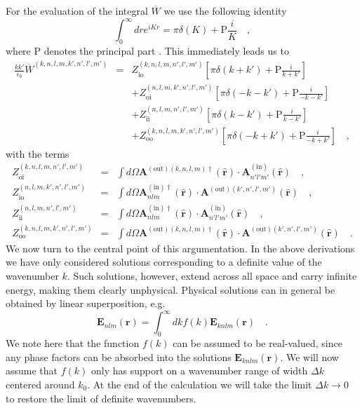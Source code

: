 \documentclass[10pt,letterpaper]{article}
\renewcommand{\vec}[1]{\mathbf{#1}}
\let\oldhat\hat
\renewcommand{\hat}[1]{\oldhat{\vec{#1}}}
\begin{document}
For the evaluation of the integral $\overline{W}$ we use the following identity
\begin{equation}
\int_{0}^{\infty}dre^{iKr}=\pi\delta(K)+\text{P}\frac{i}{K} \quad ,
\end{equation}
where $\text{P}$ denotes the principal part \cite{Bronshtein2013}. This immediately leads us to
\begin{eqnarray}
\frac{kk'}{\epsilon_b}\overline{W}^{(k,n,l,m,k',n',l',m')} &=& Z_{\text{io}}^{(k,n,l,m,n',l',m')}[\pi\delta(k+k')+\text{P}\frac{i}{k+k'}] \nonumber \\
& & +Z_{\text{oi}}^{(n,l,m,k',n',l',m')}[\pi\delta(-k-k')+\text{P}\frac{i}{-k-k'}] \nonumber \\
& & +Z_{\text{ii}}^{(n,l,m,n',l',m')}[\pi\delta(k-k')+\text{P}\frac{i}{k-k'}] \nonumber \\
& & +Z_{\text{oo}}^{(k,n,l,m,k',n',l',m')}[\pi\delta(-k+k')+\text{P}\frac{i}{-k+k'}] \quad ,\label{eq:norm_integral_infinite_part}
\end{eqnarray}
with the terms
\begin{eqnarray}
Z_{\text{oi}}^{(k,n,l,m,n',l',m')} &=& \int d\Omega \vec{A}^{(\text{out})(k,n,l,m)\dagger}(\hat{r}) \cdot \vec{A}_{n'l'm'}^{(\text{in})}(\hat{r})  \quad , \nonumber \\ 
Z_{\text{io}}^{(n,l,m,k',n',l',m')} &=& \int d\Omega \vec{A}_{nlm}^{(\text{in})\dagger}(\hat{r}) \cdot \vec{A}^{(\text{out})(k',n',l',m')}(\hat{r})  \quad , \nonumber \\ 
Z_{\text{ii}}^{(n,l,m,n',l',m')} &=& \int d\Omega \vec{A}_{nlm}^{(\text{in})\dagger}(\hat{r}) \cdot \vec{A}_{n'l'm'}^{(\text{in})}(\hat{r})  \quad , \nonumber \\ 
Z_{\text{oo}}^{(k,n,l,m,k',n',l',m')} &=& \int d\Omega \vec{A}^{(\text{out})(k,n,l,m)\dagger}(\hat{r}) \cdot \vec{A}^{(\text{out})(k',n',l',m')}(\hat{r}) \quad .
\end{eqnarray}
We now turn to the central point of this argumentation. In the above derivations we have only considered solutions corresponding to a definite value of the wavenumber $k$. Such solutions, however, extend across all space and carry infinite energy, making them clearly unphysical. Physical solutions can in general be obtained by linear superposition, e.g.
\begin{equation} \label{eq:physical_field}
\vec{E}_{nlm}(\vec{r}) = \int_0^\infty dk f(k) \vec{E}_{knlm}(\vec{r}) \quad .
\end{equation}
We note here that the function $f(k)$ can be assumed to be real-valued, since any phase factors can be absorbed into the solutions $\vec{E}_{knlm}(\vec{r})$. We will now assume that $f(k)$ only has support on a wavenumber range of width $\Delta k$ centered around $k_0$. At the end of the calculation we will take the limit $\Delta k \rightarrow 0$ to restore the limit of definite wavenumbers.
\end{document}
